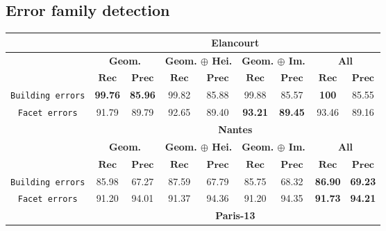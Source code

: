     \subsection{Error family detection}
        \label{subsec::more_experiments::finesse::2}
        \begin{table}[htbp]
            \footnotesize
            \centering
            \begin{tabular}{|c | c c | c c | c c | c c |}
                \hline
                & \multicolumn{8}{c|}{\textbf{Elancourt}}\\
                \hline
                & \multicolumn{2}{c|}{\textbf{Geom.}} & \multicolumn{2}{c|}{\textbf{Geom. \(\oplus\) Hei.}} & \multicolumn{2}{c|}{\textbf{Geom. \(\oplus\) Im.}} & \multicolumn{2}{x{1.8cm}|}{\textbf{All}}\\
                \cline{2-9}
                & \(\bm{Rec}\) & \(\bm{Prec}\) &  \(\bm{Rec}\) & \(\bm{Prec}\) &  \(\bm{Rec}\) & \(\bm{Prec}\) &  \(\bm{Rec}\) & \(\bm{Prec}\) \\
                \hline
                \texttt{Building errors} & \textbf{99.76} & \textbf{85.96} & 99.82 & 85.88 & 99.88 & 85.57 & \textbf{100} & 85.55 \\
                \hline
                \texttt{Facet errors} & 91.79 & 89.79 & 92.65 & 89.40 & \textbf{93.21} & \textbf{89.45} & 93.46 & 89.16 \\
                \hline
                \hline
                & \multicolumn{8}{c|}{\textbf{Nantes}}\\
                \hline
                & \multicolumn{2}{c|}{\textbf{Geom.}} & \multicolumn{2}{c|}{\textbf{Geom. \(\oplus\) Hei.}} & \multicolumn{2}{c|}{\textbf{Geom. \(\oplus\) Im.}} & \multicolumn{2}{x{1.8cm}|}{\textbf{All}}\\
                \cline{2-9}
                & \(\bm{Rec}\) & \(\bm{Prec}\) &  \(\bm{Rec}\) & \(\bm{Prec}\) &  \(\bm{Rec}\) & \(\bm{Prec}\) &  \(\bm{Rec}\) & \(\bm{Prec}\) \\
                \hline
                \texttt{Building errors} & 85.98 & 67.27 & 87.59 & 67.79 & 85.75 & 68.32 & \textbf{86.90} & \textbf{69.23} \\
                \hline
                \texttt{Facet errors} & 91.20 & 94.01 & 91.37 & 94.36 & 91.20 & 94.35 & \textbf{91.73} & \textbf{94.21}\\
                \hline
                \hline
                & \multicolumn{8}{c|}{\textbf{Paris-13}}\\

\end{tabular}
\end{table}
